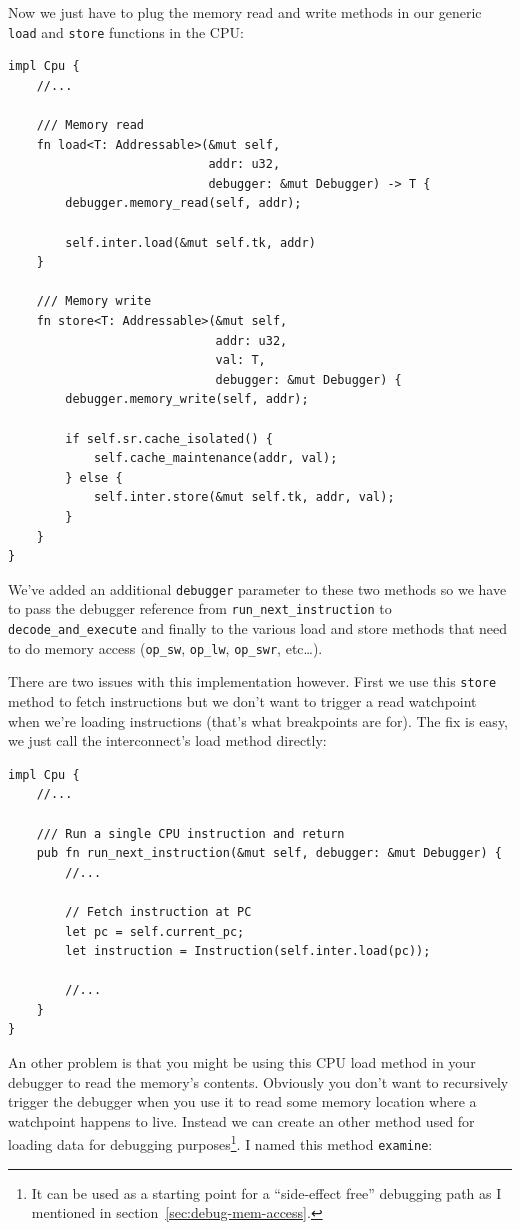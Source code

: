 \documentclass[a4paper]{article}
\newcommand{\code}[1] {\texttt{#1}}
\begin{document}
Now we just have to plug the memory read and write methods in our
generic \code{load} and \code{store} functions in the CPU:

\begin{lstlisting}
impl Cpu {
    //...

    /// Memory read
    fn load<T: Addressable>(&mut self,
                            addr: u32,
                            debugger: &mut Debugger) -> T {
        debugger.memory_read(self, addr);

        self.inter.load(&mut self.tk, addr)
    }

    /// Memory write
    fn store<T: Addressable>(&mut self,
                             addr: u32,
                             val: T,
                             debugger: &mut Debugger) {
        debugger.memory_write(self, addr);

        if self.sr.cache_isolated() {
            self.cache_maintenance(addr, val);
        } else {
            self.inter.store(&mut self.tk, addr, val);
        }
    }
}
\end{lstlisting}

We've added an additional \code{debugger} parameter to these two
methods so we have to pass the debugger reference from
\code{run\_next\_instruction} to \code{decode\_and\_execute} and
finally to the various load and store methods that need to do memory
access (\code{op\_sw}, \code{op\_lw}, \code{op\_swr}, etc\dots{}).

There are two issues with this implementation however. First we
use this \code{store} method to fetch instructions but we don't want
to trigger a read watchpoint when we're loading instructions (that's
what breakpoints are for). The fix is easy, we just call the
interconnect's load method directly:

\begin{lstlisting}
impl Cpu {
    //...

    /// Run a single CPU instruction and return
    pub fn run_next_instruction(&mut self, debugger: &mut Debugger) {
        //...

        // Fetch instruction at PC
        let pc = self.current_pc;
        let instruction = Instruction(self.inter.load(pc));

        //...
    }
}
\end{lstlisting}

An other problem is that you might be using this CPU load method in
your debugger to read the memory's contents. Obviously you don't want
to recursively trigger the debugger when you use it to read some
memory location where a watchpoint happens to live. Instead we can
create an other method used for loading data for debugging
purposes\footnote{It can be used as a starting point for a
  ``side-effect free'' debugging path as I mentioned in
  section~\ref{sec:debug-mem-access}.}. I named this method
\code{examine}:
\end{document}
